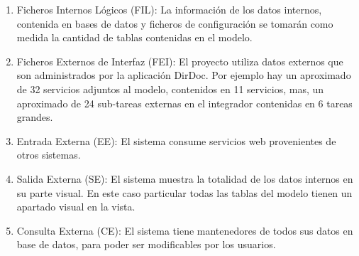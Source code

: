 \documentclass[a4paper,12pt,openany,oneside]{book}
\begin{document}
\begin{enumerate}
	\item Ficheros Internos Lógicos (FIL): La información de los datos internos, contenida en bases de datos y ficheros de configuración se tomarán como medida la cantidad de tablas contenidas en el modelo.
	\item Ficheros Externos de Interfaz (FEI): El proyecto utiliza datos externos que son administrados por la aplicación DirDoc. Por ejemplo hay un aproximado de 32 servicios adjuntos al modelo, contenidos en 11 servicios, mas, un aproximado de 24 sub-tareas externas en el integrador contenidas en 6 tareas grandes.
	\item Entrada Externa (EE): El sistema consume servicios web provenientes de otros sistemas.
	\item Salida Externa (SE): El sistema muestra la totalidad de los datos internos en su parte visual. En este caso particular todas las tablas del modelo tienen un apartado visual en la vista.
	\item Consulta Externa (CE): El sistema tiene mantenedores de todos sus datos en base de datos, para poder ser modificables por los usuarios.
\end{enumerate}
\end{document}

